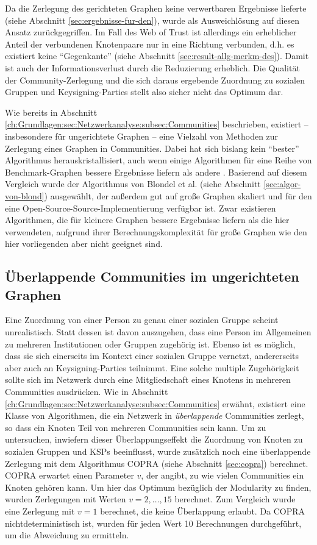 Da die Zerlegung des gerichteten Graphen keine verwertbaren Ergebnisse
lieferte (siehe Abschnitt \ref{sec:ergebnisse-fur-den}), wurde als
Ausweichlösung auf diesen Ansatz zurückgegriffen.  Im Fall des Web
of Trust ist allerdings ein erheblicher Anteil der verbundenen
Knotenpaare nur in eine Richtung verbunden, d.h. es existiert keine
``Gegenkante'' (siehe Abschnitt
\ref{sec:result-allg-merkm-des}). Damit ist auch der
Informationsverlust durch die Reduzierung erheblich. Die Qualität
der Community-Zerlegung und die sich daraus ergebende Zuordnung zu
sozialen Gruppen und Keysigning-Parties stellt also sicher nicht das
Optimum dar.

Wie bereits in Abschnitt
\ref{ch:Grundlagen:sec:Netzwerkanalyse:subsec:Communities}
beschrieben, existiert -- insbesondere für ungerichtete Graphen --
eine Vielzahl von Methoden zur Zerlegung eines Graphen in
Communities. Dabei hat sich bislang kein ``bester'' Algorithmus
herauskristallisiert, auch wenn einige Algorithmen für eine Reihe
von Benchmark-Graphen bessere Ergebnisse liefern als andere
\cite{Lancichinetti2009}. Basierend auf diesem Vergleich wurde der
Algorithmus von Blondel et al. (siehe Abschnitt
\ref{sec:algor-von-blond}) ausgewählt, der außerdem gut auf große
Graphen skaliert und für den eine Open-Source-Source-Implementierung
verfügbar ist.  Zwar existieren Algorithmen, die für kleinere
Graphen bessere Ergebnisse liefern als die hier verwendeten, aufgrund
ihrer Berechnungskomplexität für große Graphen wie den hier
vorliegenden aber nicht geeignet sind.

\subsection{Überlappende Communities im ungerichteten Graphen}
\label{sec:uberl-comm-unger}

Eine Zuordnung von einer Person zu genau einer sozialen Gruppe scheint
unrealistisch. Statt dessen ist davon auszugehen, dass eine Person im
Allgemeinen zu mehreren Institutionen oder Gruppen zugehörig
ist. Ebenso ist es möglich, dass sie sich einerseits im Kontext einer
sozialen Gruppe vernetzt, andererseits aber auch an Keysigning-Parties
teilnimmt. Eine solche multiple Zugehörigkeit sollte sich im Netzwerk
durch eine Mitgliedschaft eines Knotens in mehreren Communities
ausdrücken. Wie in Abschnitt
\ref{ch:Grundlagen:sec:Netzwerkanalyse:subsec:Communities} erwähnt,
existiert eine Klasse von Algorithmen, die ein Netzwerk in
\emph{überlappende} Communities zerlegt, so dass ein Knoten Teil von
mehreren Communities sein kann. Um zu untersuchen, inwiefern dieser
Überlappungseffekt die Zuordnung von Knoten zu sozialen Gruppen und
KSPs beeinflusst, wurde zusätzlich noch eine überlappende Zerlegung
mit dem Algorithmus COPRA (siehe Abschnitt \ref{sec:copra})
berechnet. COPRA erwartet einen Parameter $v$, der angibt, zu wie
vielen Communities ein Knoten gehören kann. Um hier das Optimum
bezüglich der Modularity zu finden, wurden Zerlegungen mit Werten
$v=2, \dots, 15$ berechnet. Zum Vergleich wurde eine Zerlegung mit
$v=1$ berechnet, die keine Überlappung erlaubt. Da COPRA
nichtdeterministisch ist, wurden für jeden Wert 10 Berechnungen
durchgeführt, um die Abweichung zu ermitteln.



